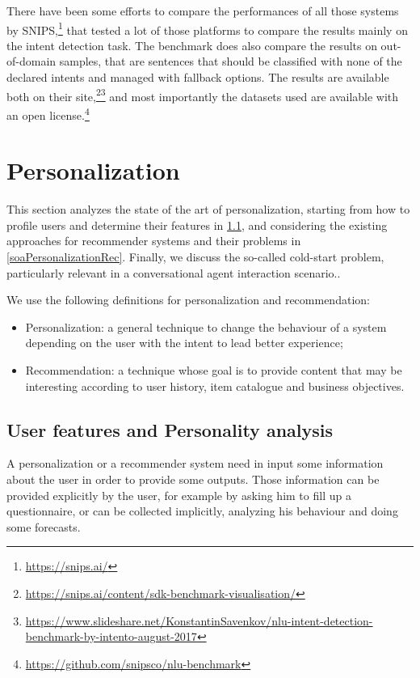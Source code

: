 There have been some efforts to compare the performances of all those systems by SNIPS,\footnote{\url{https://snips.ai/}} that tested a lot of those platforms to compare the results mainly on the intent detection task. The benchmark does also compare the results on out-of-domain samples, that are sentences that should be classified with none of the declared intents and managed with fallback options. The results are available both on their site,\footnote{\url{https://snips.ai/content/sdk-benchmark-visualisation/}}\footnote{\url{https://www.slideshare.net/KonstantinSavenkov/nlu-intent-detection-benchmark-by-intento-august-2017}} and most importantly the datasets used are available with an open license.\footnote{\url{https://github.com/snipsco/nlu-benchmark}}

\section{Personalization}
\label{soaPersonalization}

This section analyzes the state of the art of personalization, starting from how to profile users and determine their features in \ref{soaPersonalizationFeatures}, and considering the existing approaches for recommender systems and their problems in \ref{soaPersonalizationRec}. Finally, we discuss the so-called cold-start problem, particularly relevant in a conversational agent interaction scenario..

We use the following definitions for personalization and recommendation:

\begin{itemize}
	\item Personalization: a general technique to change the behaviour of a system depending on the user with the intent to lead better experience;

	\item Recommendation: a technique whose goal is to provide content that may be interesting according to user history, item catalogue and business objectives.
\end{itemize}

\subsection{User features and Personality analysis}
\label{soaPersonalizationFeatures}

A personalization or a recommender system need in input some information about the user in order to provide some outputs. Those information can be provided explicitly by the user, for example by asking him to fill up a questionnaire, or can be collected implicitly, analyzing his behaviour and doing some forecasts.

